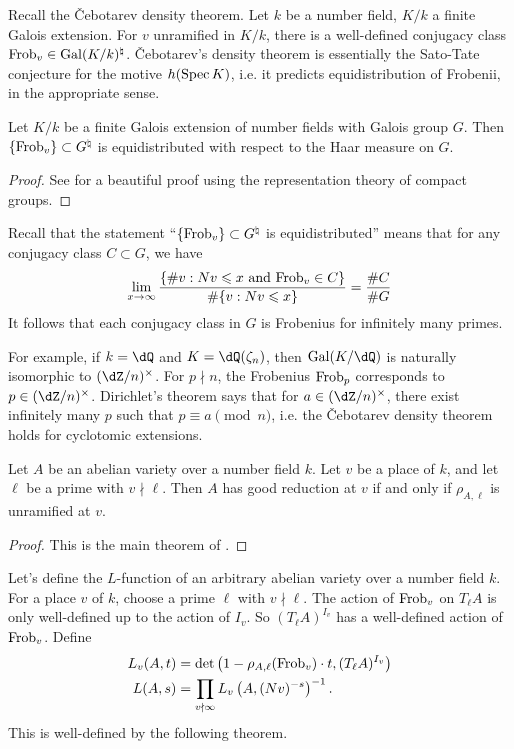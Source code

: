 Recall the \v Cebotarev density theorem. Let $k$ be a number field, $K/k$ a 
finite Galois extension. For $v$ unramified in $K/k$, there is a well-defined 
conjugacy class $\mathrm{Frob}_v\in \operatorname{Gal}(K/k)^\natural$. \v Cebotarev's density theorem 
is essentially the Sato-Tate conjecture for the motive 
$h(\operatorname{Spec} K)$, i.e. it predicts equidistribution of Frobenii, in the appropriate 
sense. 

\begin{theorem}[\v Cebotarev]
Let $K/k$ be a finite Galois extension of number fields with Galois group $G$. Then 
$\{\mathrm{Frob}_v\}\subset G^\natural$ is equidistributed with respect to the Haar 
measure on $G$. 
\end{theorem}
\begin{proof}
See \cite[1.2.2]{se68} for a beautiful proof using the representation theory of 
compact groups. 
\end{proof}

Recall that the statement ``$\{\mathrm{Frob}_v\}\subset G^\natural$ is 
equidistributed'' means that for any conjugacy class $C\subset G$, we have 
\[
  \lim_{x \to \infty} \frac{\{\# v : N v \leqslant x \text{ and } \mathrm{Frob}_v\in C\}}{\# \{v:N v\leqslant x\}} = \frac{\# C}{\# G}
\]
It follows that each conjugacy class in $G$ is Frobenius for infinitely many 
primes.  

For example, if $k=\dQ$ and $K=\dQ(\zeta_n)$, then $\gal(K/\dQ)$ is naturally 
isomorphic to $(\dZ/n)^\times$. For $p\nmid n$, the Frobenius $\mathrm{Frob}_p$ 
corresponds to $p\in (\dZ/n)^\times$. Dirichlet's theorem says that for 
$a\in (\dZ/n)^\times$, there exist infinitely many $p$ such that 
$p\equiv a\pmod n$, i.e. the \v Cebotarev density theorem holds for cyclotomic 
extensions. 

\begin{theorem}
Let $A$ be an abelian variety over a number field $k$. Let $v$ be a place of 
$k$, and let $\ell$ be a prime with $v\nmid \ell$. Then $A$ has good reduction 
at $v$ if and only if $\rho_{A,\ell}$ is unramified at $v$. 
\end{theorem}
\begin{proof}
This is the main theorem of \cite{st68}. 
\end{proof}

Let's define the $L$-function of an arbitrary abelian variety over a number 
field $k$. For a place $v$ of $k$, choose a prime $\ell$ with $v\nmid \ell$. 
The action of $\mathrm{Frob}_v$ on $T_\ell A$ is only well-defined up to the action of 
$I_v$. So $(T_\ell A)^{I_v}$ has a well-defined action of $\mathrm{Frob}_v$. Define  
\begin{align*}
  L_v(A,t) &= \det\left(1-\rho_{A,\ell}(\mathrm{Frob}_v)\cdot t,(T_\ell A)^{I_v}\right) \\
  L(A,s) &= \prod_{v\nmid \infty} L_v\left(A,(N v)^{-s}\right)^{-1} \text{.}
\end{align*}
This is well-defined by the following theorem. 

